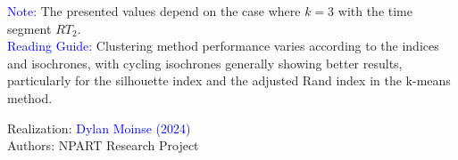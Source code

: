     \begin{table}[h!]
    \centering
    \renewcommand{\arraystretch}{1.5}
    \caption{Review of overall clustering method performance.}
    \label{table-chap6:valeurs-indices-sc-ch-ari-jc}
        \vspace{5pt}
        \begin{flushleft}\scriptsize{
        \textcolor{blue}{Note:} The presented values depend on the case where \(k = 3\) with the time segment \(RT_{2}\).
        \\
        \textcolor{blue}{Reading Guide:} Clustering method performance varies according to the indices and isochrones, with cycling isochrones generally showing better results, particularly for the silhouette index and the adjusted Rand index in the k-means method.
        }\end{flushleft}
        \begin{flushright}\scriptsize{
        Realization: \textcolor{blue}{Dylan Moinse (2024)}
        \\
        Authors: \acrshort{NPART} Research Project
        }\end{flushright}
        \end{table}